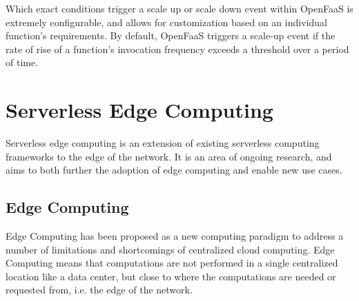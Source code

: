 \documentclass[draft,final]{vutinfth} %
\begin{document}
Which exact conditions trigger a scale up or scale down event within OpenFaaS is extremely configurable, and allows for customization based on an individual function's requirements.
By default, OpenFaaS triggers a scale-up event if the rate of rise of a function's invocation frequency exceeds a threshold over a period of time.




\section{Serverless Edge Computing}

Serverless edge computing is an extension of existing serverless computing frameworks to the edge of the network.
It is an area of ongoing research, and aims to both further the adoption of edge computing and enable new use cases\cite{nasticServerlessRealTimeData2017}.

\subsection{Edge Computing}
Edge Computing has been proposed as a new computing paradigm to address a number of limitations and shortcomings of centralized cloud computing.
Edge Computing means that computations are not performed in a single centralized location like a data center, but close to where the computations are needed or requested from, i.e. the edge of the network\cite{shiPromiseEdgeComputing2016}.
\end{document}
